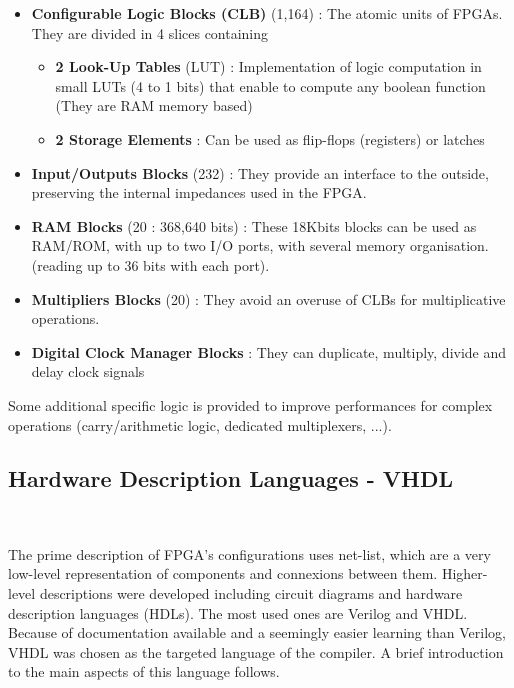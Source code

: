 \documentclass[10pt,a4paper]{article}
\renewcommand{\indent}{~\\\vspace{-.8cm}}
\begin{document}
\begin{itemize}
	\item \textbf{Configurable Logic Blocks (CLB)} (1,164) : The atomic units of FPGAs.
	They are divided in 4 slices  containing
	\begin{itemize}
		\item \textbf{2 Look-Up Tables} (LUT) : Implementation of logic computation in small LUTs (4 to 1 bits) that enable to compute any boolean function (They are RAM memory based)
		\item \textbf{2 Storage Elements} : Can be used as flip-flops (registers) or latches
	\end{itemize}
	\item \textbf{Input/Outputs Blocks} (232) : They provide an interface to the outside, preserving the internal impedances used in the FPGA.
\end{itemize}

\begin{itemize}
	\item \textbf{RAM Blocks} (20 : 368,640 bits) : These 18Kbits blocks can be used as RAM/ROM, with up to two I/O ports, with several memory organisation. (reading up to 36 bits with each port).
	\item \textbf{Multipliers Blocks} (20) : They avoid an overuse of CLBs for multiplicative operations.
	\item \textbf{Digital Clock Manager Blocks} : They can duplicate, multiply, divide and delay clock signals
\end{itemize}

Some additional specific logic is provided to improve performances for complex operations (carry/arithmetic logic, dedicated multiplexers, ...).




\subsection{Hardware Description Languages - VHDL}
\indent

The prime description of FPGA's configurations uses net-list, which are a very low-level representation of components and connexions between them. Higher-level descriptions were developed including circuit diagrams and hardware description languages (HDLs). The most used ones are Verilog and VHDL. Because of documentation available and a seemingly easier learning  than Verilog, VHDL was chosen as the targeted language of the compiler. A brief introduction to the main aspects of this language follows\cite{FRV}.
\end{document}
